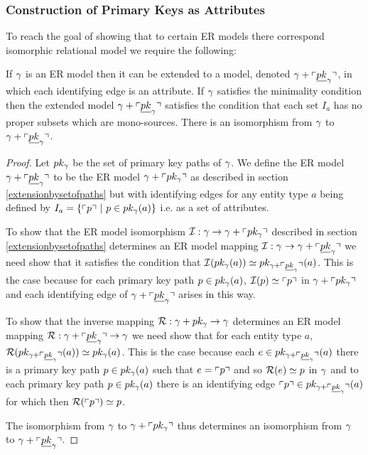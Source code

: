 \subsubsection{Construction of Primary Keys as Attributes}

To reach the goal of showing that to certain ER models there correspond isomorphic relational model we require the following:
\begin{lemma}
If $\gmodel$ is an ER model then it can be extended to a model, denoted  $\pkext$,
in which each identifying edge is an attribute. If $\gmodel$ satisfies the minimality condition then the
extended model $\pkext$ satisfies the  condition that each set $I_a$ has no proper subsets which are mono-sources. 
There is an isomorphism from $\gmodel$ to $\pkext$.
\end{lemma}
\begin{proof}
Let $\pkp$ be the set of primary key paths of $\gmodel$. We define the ER model $\pkext$ to be the
ER model   $\gmodel + \qq{\pkp}$ as described in section \ref{extensionbysetofpaths} but with identifying edges for any entity type $a$ being defined
by $I_a = \setsuchthat{\qq{p}}{p \in \pk{a}}$ i.e. as a set of attributes. 

To show that the ER model isomorphism $\inject: \gmodel \morph \gmodel + \qq{\pkp}$ 
described in section \ref{extensionbysetofpaths}   determines an ER model mapping  $\inject: \gmodel \morph \pkext$
we need show that it satisfies the condition that $\inject(\pk{a}) \simeq \pk[\pkext]{a}$. This is the case because for each primary key path $p \in \pk{a}$,
$\inject(p) \simeq \qq{p}$ in $\gmodel + \qq{\pkp}$ and each identifying edge of $\pkext$ arises in this way.

To show that the inverse mapping $\retract: \gmodel + \pkp \morph \gmodel$ determines an ER model mapping  $\retract: \pkext \morph \gmodel$ 
we need show that for each entity type $a$, $\retract(\pk[\pkext]{a}) \simeq \pk{a}$. 
This is the case because each  $e \in \pk[\pkext]{a}$ there is a primary key path $p \in \pk{a}$ 
such that $e = \qq{p}$ and so $\retract(e) \simeq p$ in $\gmodel$ and to each primary key path $p \in \pk{a}$ there is an identifying edge $\qq{p} \in \pk[\pkext]{a}$
for which then  $\retract(\qq{p}) \simeq p$. 

The isomorphism from $\gmodel$ to $\gmodel + \qq{\pkp}$ thus determines an isomorphism from $\gmodel$ to $\pkext$. 

\end{proof}


